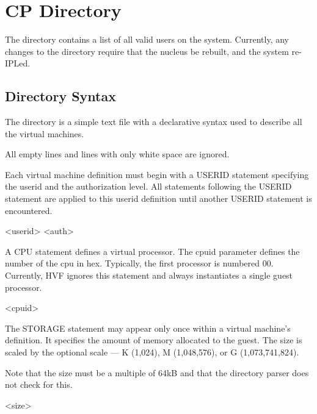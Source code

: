 \chapter{CP Directory}
\label{chap:directory}
The directory contains a list of all valid users on the system.  Currently,
any changes to the directory require that the nucleus be rebuilt, and the
system re-IPLed.

\section{Directory Syntax}
The directory is a simple text file with a declarative syntax used to
describe all the virtual machines.

All empty lines and lines with only white space are ignored.

Each virtual machine definition must begin with a USERID statement
specifying the userid and the authorization level.  All statements following
the USERID statement are applied to this userid definition until another
USERID statement is encountered.

\begin{syntdiag}
 <userid> <auth>
\end{syntdiag}

A CPU statement defines a virtual processor.  The cpuid parameter defines
the number of the cpu in hex.  Typically, the first processor is numbered
00.  Currently, HVF ignores this statement and always instantiates a single
guest processor.

\begin{syntdiag}
 <cpuid>
\end{syntdiag}

The STORAGE statement may appear only once within a virtual machine's
definition.  It specifies the amount of memory allocated to the guest.  The
size is scaled by the optional scale --- K (\mbox{1,024}), M
(\mbox{1,048,576}), or G (\mbox{1,073,741,824}).

Note that the size must be a multiple of 64kB and that the directory parser
does not check for this.

\begin{syntdiag}
 <size>
\begin{stack}
	\\
	 \\
	 \\
\end{stack}
\end{syntdiag}

